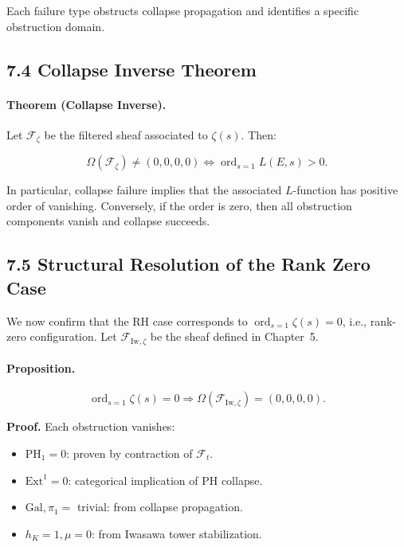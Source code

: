 \documentclass[11pt]{article}
\begin{document}
Each failure type obstructs collapse propagation and identifies a specific obstruction domain.

\subsection*{7.4 Collapse Inverse Theorem}

\paragraph{Theorem (Collapse Inverse).}  
Let \( \mathcal{F}_{\zeta} \) be the filtered sheaf associated to \( \zeta(s) \). Then:

\[
\Omega(\mathcal{F}_{\zeta}) \neq (0,0,0,0) \iff \operatorname{ord}_{s=1} L(E,s) > 0.
\]

In particular, collapse failure implies that the associated \( L \)-function has positive order of vanishing. Conversely, if the order is zero, then all obstruction components vanish and collapse succeeds.

\subsection*{7.5 Structural Resolution of the Rank Zero Case}

We now confirm that the RH case corresponds to \( \operatorname{ord}_{s=1} \zeta(s) = 0 \), i.e., rank-zero configuration. Let \( \mathcal{F}_{\mathrm{Iw},\zeta} \) be the sheaf defined in Chapter~5.

\paragraph{Proposition.}  
\[
\operatorname{ord}_{s=1} \zeta(s) = 0 \Rightarrow \Omega(\mathcal{F}_{\mathrm{Iw},\zeta}) = (0,0,0,0).
\]

\textbf{Proof.}  
Each obstruction vanishes:

\begin{itemize}
    \item \( \mathrm{PH}_1 = 0 \): proven by contraction of \( \mathcal{F}_t \).
    \item \( \mathrm{Ext}^1 = 0 \): categorical implication of PH collapse.
    \item \( \mathrm{Gal}, \pi_1 = \) trivial: from collapse propagation.
    \item \( h_K = 1, \mu = 0 \): from Iwasawa tower stabilization.
\end{itemize}
\end{document}
